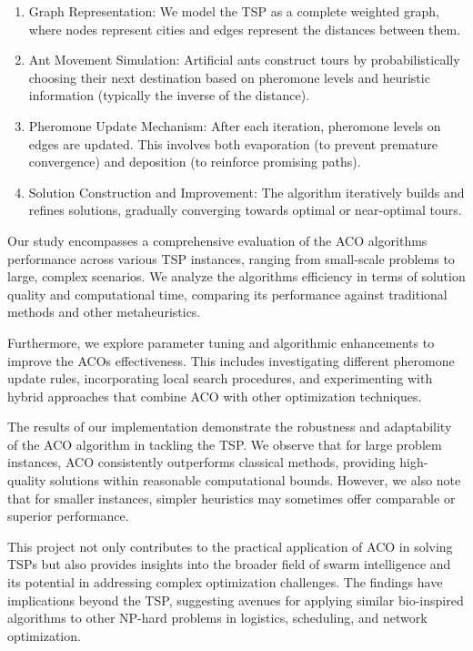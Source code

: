 \documentclass[
]{article}
\begin{document}
\begin{enumerate}
\def\labelenumi{\arabic{enumi}.}
\item
  Graph Representation: We model the TSP as a complete weighted graph,
  where nodes represent cities and edges represent the distances between
  them.
\item
  Ant Movement Simulation: Artificial ants construct tours by
  probabilistically choosing their next destination based on pheromone
  levels and heuristic information (typically the inverse of the
  distance).
\item
  Pheromone Update Mechanism: After each iteration, pheromone levels on
  edges are updated. This involves both evaporation (to prevent
  premature convergence) and deposition (to reinforce promising paths).
\item
  Solution Construction and Improvement: The algorithm iteratively
  builds and refines solutions, gradually converging towards optimal or
  near-optimal tours.
\end{enumerate}

Our study encompasses a comprehensive evaluation of the ACO
algorithm\textquotesingle s performance across various TSP instances,
ranging from small-scale problems to large, complex scenarios. We
analyze the algorithm\textquotesingle s efficiency in terms of solution
quality and computational time, comparing its performance against
traditional methods and other metaheuristics.

Furthermore, we explore parameter tuning and algorithmic enhancements to
improve the ACO\textquotesingle s effectiveness. This includes
investigating different pheromone update rules, incorporating local
search procedures, and experimenting with hybrid approaches that combine
ACO with other optimization techniques.

The results of our implementation demonstrate the robustness and
adaptability of the ACO algorithm in tackling the TSP. We observe that
for large problem instances, ACO consistently outperforms classical
methods, providing high-quality solutions within reasonable
computational bounds. However, we also note that for smaller instances,
simpler heuristics may sometimes offer comparable or superior
performance.

This project not only contributes to the practical application of ACO in
solving TSPs but also provides insights into the broader field of swarm
intelligence and its potential in addressing complex optimization
challenges. The findings have implications beyond the TSP, suggesting
avenues for applying similar bio-inspired algorithms to other NP-hard
problems in logistics, scheduling, and network optimization.
\end{document}
